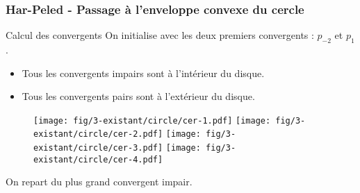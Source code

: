 
\begin{frame}
  \frametitle{Har-Peled - Passage à l'enveloppe convexe du cercle}
  		
			\begin{block}{Calcul des convergents}
					On initialise avec les deux premiers convergents : $p_{-2}$ et $p_{1}$.
				\begin{itemize}
	        \item Tous les convergents impairs sont à l'intérieur du disque.
					\item Tous les convergents pairs sont à l'extérieur du disque.
	      \end{itemize}
		
	    \end{block}

				\begin{figure}[h!]
					\centering
				  \texttt{[image: fig/3-existant/circle/cer-1.pdf]}
				  \texttt{[image: fig/3-existant/circle/cer-2.pdf]}
					\texttt{[image: fig/3-existant/circle/cer-3.pdf]}
				  \texttt{[image: fig/3-existant/circle/cer-4.pdf]}
			 	\end{figure}    
      {
			\begin{block}{}
					\alert{On repart du plus grand convergent impair.}
	    \end{block}
      }

\end{frame}


